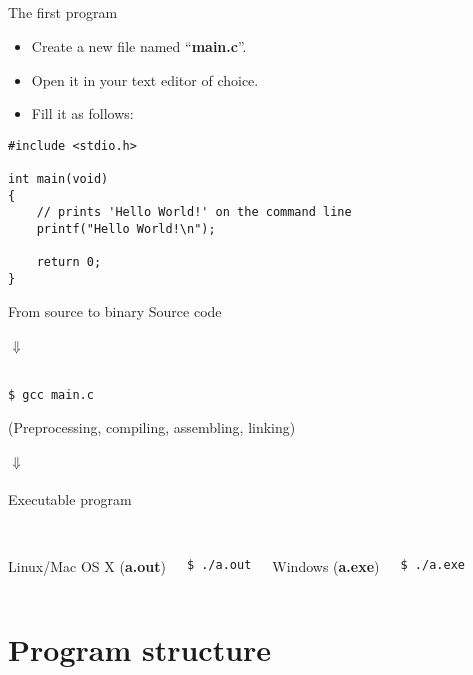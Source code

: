 \subsection{}
\begin{frame}[fragile]{The first program}
	\begin{itemize}
		\item Create a new file named ``\textbf{main.c}''.
		\item Open it in your text editor of choice.
		\item Fill it as follows:
	\end{itemize}
	\begin{lstlisting}
#include <stdio.h>

int main(void)
{
	// prints 'Hello World!' on the command line
	printf("Hello World!\n");

	return 0;
}
\end{lstlisting}
\end{frame}
\begin{frame}[fragile]{From source to binary}
	\centering
	Source code\\\ \\
	$\Downarrow$\\\ \\
	\begin{lstlisting}[numbers=none]
$ gcc main.c
\end{lstlisting}
(Preprocessing, compiling, assembling, linking)
	\ \\\ \\
	$\Downarrow$\\\ \\
	Executable program\\\ \\
	\begin{columns}[T]
		Linux/Mac OS X (\textbf{a.out})
		\begin{lstlisting}[numbers=none]
$ ./a.out
\end{lstlisting}
		Windows (\textbf{a.exe})
		\begin{lstlisting}[numbers=none]
$ ./a.exe
\end{lstlisting}
	\end{columns}
\end{frame}
\section{Program structure}
